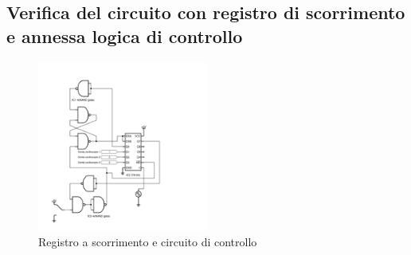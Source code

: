 \documentclass[journal]{IEEEtran}
\begin{document}
\subsection{Verifica del circuito con registro di scorrimento e annessa logica di controllo}

\begin{figure}[H]%
\begin{center}
\includegraphics[width=0.50\textwidth]{sch-simulations/digital/output/shift-register.pdf}
\caption{Registro a scorrimento e circuito di controllo}
\label{fig:circuit_shift_register}
\end{center}
\end{figure}
\end{document}
